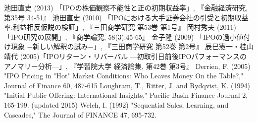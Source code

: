\documentclass{jsarticle}
\begin{document}
\begin{thebibliography}{99}
 池田直史 (2013) 「IPOの株価観察不能性と正の初期収益率」, 『金融経済研究, 第35号 34-51』
 池田直史 (2010) 「IPOにおける大手証券会社の引受と初期収益率:利益相反仮説の検証」, 『三田商学研究 第53巻 第1号』
 岡村秀夫 (2011)「IPO研究の展開」, 『商学論究, 58(3):45-65』
 金子隆 (2009) 「IPOの過小値付け現象 −新しい解釈の試み−」, 『三田商学研究 第52巻 第2号』
 辰巳憲一・桂山靖代 (2005)「IPOリターン・リバーバル —初取引日前後IPOパフォーマンスのアノマリー分析—」, 『学習院大学 経済論集, 第42巻 第3号』
 Derrien, F. (2005) "IPO Pricing in "Hot" Market Conditions: Who Leaves Money On the Table?," Journal of Finance 60, 487-615
 Loughram, T., Ritter, J. and Rydqvist, K. (1994) "Initial Public Offering: International Insights," Pacific-Basin Finance Journal 2, 165-199. (updated 2015)
 Welch, I. (1992) "Sequential Sales, Learning, and Cascades," The Journal of FINANCE 47, 695-732.

\end{thebibliography}
\end{document}
